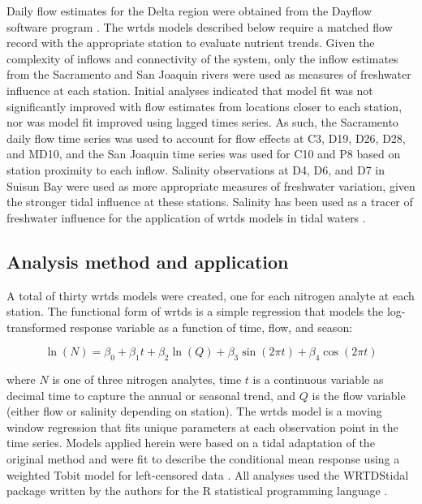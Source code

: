 \documentclass[letterpaper,12pt,oneside]{article}\usepackage[]{graphicx}\usepackage[]{color}
\begin{document}
Daily flow estimates for the Delta region were obtained from the Dayflow software program \cite{IEP16}. The \ac{wrtds} models described below require a matched flow record with the appropriate station to evaluate nutrient trends. Given the complexity of inflows and connectivity of the system, only the inflow estimates from the Sacramento and San Joaquin rivers were used as measures of freshwater influence at each station.  Initial analyses indicated that model fit was not significantly improved with flow estimates from locations closer to each station, nor was model fit improved using lagged times series.  As such, the Sacramento daily flow time series was used to account for flow effects at C3, D19, D26, D28, and MD10, and the San Joaquin time series was used for C10 and P8 based on station proximity to each inflow.  Salinity observations at D4, D6, and D7 in Suisun Bay were used as more appropriate measures of freshwater variation, given the stronger tidal influence at these stations.  Salinity has been used as a tracer of freshwater influence for the application of \ac{wrtds} models in tidal waters \cite{Beck15}.  

\subsection{Analysis method and application}

A total of thirty \ac{wrtds} models were created, one for each nitrogen analyte at each station.  The functional form of \ac{wrtds} is a simple regression\cite{Hirsch10} that models the log-transformed response variable as a function of time, flow, and season:

\begin{equation}
\ln\left(N\right) = \beta_0 + \beta_1 t + \beta_2 \ln\left(Q\right) + \beta_3 \sin\left(2\pi t\right) + \beta_4 \cos\left(2\pi t\right)
\end{equation}  

\noindent where $N$ is one of three nitrogen analytes, time $t$ is a continuous variable as decimal time to capture the annual or seasonal trend, and $Q$ is the flow variable (either flow or salinity depending on station).  The \ac{wrtds} model is a moving window regression that fits unique parameters at each observation point in the time series.  Models applied herein were based on a tidal adaptation of the original method\cite{Beck15} and were fit to describe the conditional mean response using a weighted Tobit model for left-censored data \cite{Tobin58}. All analyses used the WRTDStidal package written by the authors for the R statistical programming language \cite{Beck16b,RDCT17}.
\end{document}
